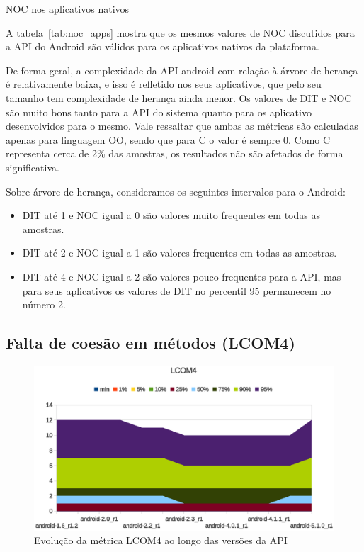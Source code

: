\begin{table}[!htb]
\centering
{}

\caption{NOC nos aplicativos nativos}
\label{tab:noc_apps}
\end{table}

A tabela~\ref{tab:noc_apps} mostra que os mesmos valores de NOC discutidos para a API do Android são válidos para os aplicativos nativos da plataforma. 

De forma geral, a complexidade da API android com relação à árvore de herança é relativamente baixa, e isso é refletido nos seus aplicativos, que pelo seu tamanho tem complexidade de herança ainda menor. Os valores de DIT e NOC são muito bons tanto para a API do sistema quanto para os aplicativo desenvolvidos para o mesmo. Vale ressaltar que ambas as métricas são calculadas apenas para linguagem OO, sendo que para C o valor é sempre 0. Como C representa cerca de 2\% das amostras, os resultados não são afetados de forma significativa.

Sobre árvore de herança, consideramos os seguintes intervalos para o Android:

\begin{itemize}
\item DIT até 1 e NOC igual a 0 são valores muito frequentes em todas as amostras.
\item DIT até 2 e NOC igual a 1 são valores frequentes em todas as amostras.
\item DIT até 4 e NOC igual a 2 são valores pouco frequentes para a API, mas para seus aplicativos os valores de DIT no percentil 95 permanecem no número 2.
\end{itemize}

\subsection{Falta de coesão em métodos (LCOM4)}

\begin{figure}[!htb]
\centering
\includegraphics [keepaspectratio=true,scale=0.85]{figuras/graphs/lcom4_android.eps}
\caption{Evolução da métrica LCOM4 ao longo das versões da API}
\label{fig:lcom4_android}
\end{figure}

